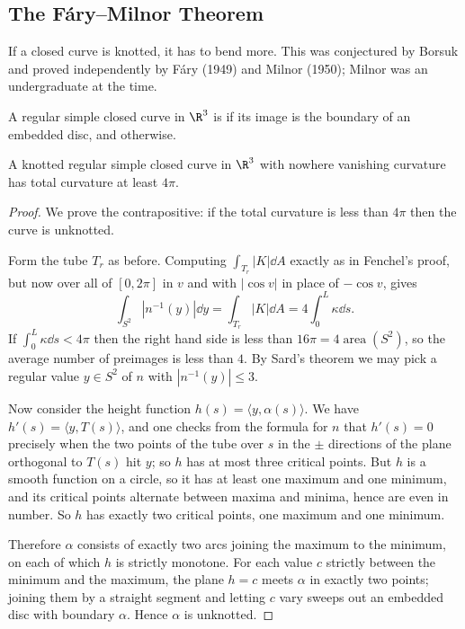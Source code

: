 \subsection{The F\'ary--Milnor Theorem}

If a closed curve is knotted, it has to bend more. This was conjectured by Borsuk and proved independently by F\'ary (1949) and Milnor (1950); Milnor was an undergraduate at the time.

\begin{definition}[Unknotted]
    A regular simple closed curve in $\R^3$ is  if its image is the boundary of an embedded disc, and  otherwise.
\end{definition}

\begin{theorem}
    A knotted regular simple closed curve in $\R^3$ with nowhere vanishing curvature has total curvature at least $4\pi$.
\end{theorem}
\begin{proof}
    We prove the contrapositive: if the total curvature is less than $4\pi$ then the curve is unknotted.

    Form the tube $T_r$ as before. Computing $\int_{T_r}|K|\dd A$ exactly as in Fenchel's proof, but now over all of $[0,2\pi]$ in $v$ and with $|\cos v|$ in place of $-\cos v$, gives
    $$
    \int_{S^2}\left|n^{-1}(y)\right|\dd y = \int_{T_r}|K|\dd A = 4\int_0^L\kappa\dd s.
    $$
    If $\int_0^L\kappa \dd s < 4\pi$ then the right hand side is less than $16\pi = 4\operatorname{area}(S^2)$, so the average number of preimages is less than $4$. By Sard's theorem we may pick a regular value $y \in S^2$ of $n$ with $\left|n^{-1}(y)\right| \leq 3$.

    Now consider the height function $h(s) = \langle y, \alpha(s)\rangle$. We have $h'(s) = \langle y, T(s)\rangle$, and one checks from the formula for $n$ that $h'(s) = 0$ precisely when the two points of the tube over $s$ in the $\pm$ directions of the plane orthogonal to $T(s)$ hit $y$; so $h$ has at most three critical points. But $h$ is a smooth function on a circle, so it has at least one maximum and one minimum, and its critical points alternate between maxima and minima, hence are even in number. So $h$ has exactly two critical points, one maximum and one minimum.

    Therefore $\alpha$ consists of exactly two arcs joining the maximum to the minimum, on each of which $h$ is strictly monotone. For each value $c$ strictly between the minimum and the maximum, the plane $h = c$ meets $\alpha$ in exactly two points; joining them by a straight segment and letting $c$ vary sweeps out an embedded disc with boundary $\alpha$. Hence $\alpha$ is unknotted.
\end{proof}

